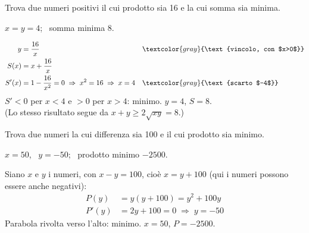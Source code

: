
\begin{question}[ID=4.2, subtitle={Due numeri positivi di prodotto 16 e somma minima}, tags={ottimizzazione, algebra}, difficulty=facile]
Trova due numeri positivi il cui prodotto sia 16 e la cui somma sia minima.
\begin{solution}
$x=y=4$; \ somma minima $8$.
\end{solution}
\begin{explanation}
\[\begin{aligned}
y &= \dfrac{16}{x} && \textcolor{gray}{\text{vincolo, con $x>0$}}\\
S(x) &= x+\dfrac{16}{x}\\
S'(x) &= 1-\dfrac{16}{x^2}=0 \;\Rightarrow\; x^2=16 \;\Rightarrow\; x=4 && \textcolor{gray}{\text{scarto $-4$}}
\end{aligned}\]
$S'<0$ per $x<4$ e $>0$ per $x>4$: minimo. $y=4$, $S=8$. \\
(Lo stesso risultato segue da $x+y\geq2\sqrt{xy}=8$.)
\end{explanation}
\end{question}


\begin{question}[ID=4.3, subtitle={Due numeri reali di differenza 100 e prodotto minimo}, tags={ottimizzazione, algebra}, difficulty=media]
Trova due numeri la cui differenza sia 100 e il cui prodotto sia minimo.
\begin{solution}
$x=50$, \ $y=-50$; \ prodotto minimo $-2500$.
\end{solution}
\begin{explanation}
Siano $x$ e $y$ i numeri, con $x-y=100$, cioè $x=y+100$ (qui i numeri possono essere anche negativi):
\[\begin{aligned}
P(y) &= y(y+100)=y^2+100y\\
P'(y) &= 2y+100=0 \;\Rightarrow\; y=-50
\end{aligned}\]
Parabola rivolta verso l'alto: minimo. $x=50$, $P=-2500$.
\end{explanation}
\end{question}


